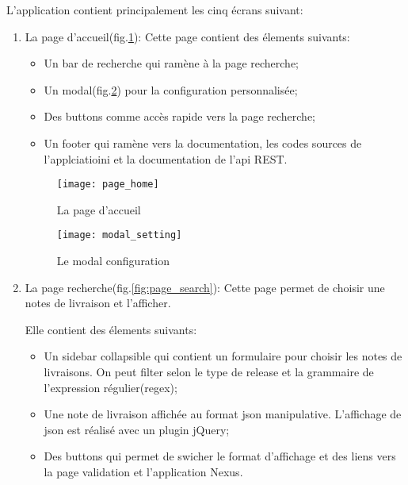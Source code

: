 L'application contient principalement les cinq écrans suivant:
\begin{enumerate}
 \item La page d'accueil(fig.\ref{fig:page_home}):
       Cette page contient des élements suivants:
       \begin{itemize}
        \item Un bar de recherche qui ramène à la page recherche;
        \item Un modal(fig.\ref{fig:modal_setting}) pour la configuration personnalisée;
        \item Des buttons comme accès rapide vers la page recherche;
        \item Un footer qui ramène vers la documentation, les codes sources de l'applciatioini et la documentation de l'api REST.
       \end{itemize}

       \begin{figure}[ht]
        \centering
        \texttt{[image: page\_home]}
        \caption{La page d'accueil}
        \label{fig:page_home}
       \end{figure}

       \begin{figure}[ht]
        \centering
        \texttt{[image: modal\_setting]}
        \caption{Le modal configuration}
        \label{fig:modal_setting}
       \end{figure}

       \clearpage

 \item La page recherche(fig.\ref{fig:page_search}):
       Cette page permet de choisir une notes de livraison et l'afficher.

       Elle contient des élements suivants:
       \begin{itemize}
        \item Un sidebar collapsible qui contient un formulaire pour choisir les notes de livraisons. On peut filter selon le type de release et la grammaire de l'expression régulier(regex);
        \item Une note de livraison affichée au format json manipulative. L'affichage de json est réalisé avec un plugin jQuery;
        \item Des buttons qui permet de swicher le format d'affichage et des liens vers la page validation et l'application Nexus.
       \end{itemize}


\end{enumerate}
